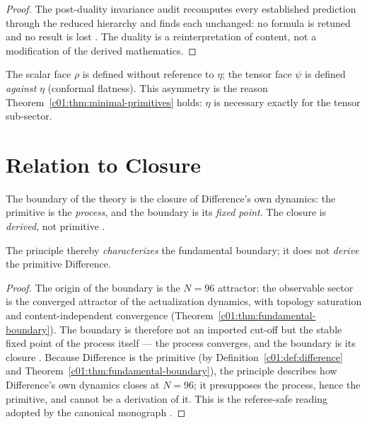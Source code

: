 \begin{proof}
The post-duality invariance audit recomputes every established prediction through the
reduced hierarchy and finds each unchanged: no formula is retuned and no result is lost
\cite{c01:QG301}. The duality is a reinterpretation of content, not a modification of
the derived mathematics.
\end{proof}

\begin{remark}
The scalar face $\rho$ is defined without reference to $\eta$; the tensor face $\psi$ is
defined \emph{against} $\eta$ (conformal flatness). This asymmetry is the reason
Theorem~\ref{c01:thm:minimal-primitives} holds: $\eta$ is necessary exactly for the tensor
sub-sector.
\end{remark}

\section{Relation to Closure}
\label{c01:sec:closure}

\begin{theorem}
\label{c01:thm:closure}
The boundary of the theory is the closure of Difference's own dynamics: the primitive is the
\emph{process}, and the boundary is its \emph{fixed point}. The closure is
\emph{derived}, not primitive \cite{c01:QG282}.

The principle thereby \emph{characterizes} the fundamental boundary; it does not \emph{derive}
the primitive Difference. \label{c01:cor:closure-characterizes}
\end{theorem}

\begin{proof}
The origin of the boundary is the $N=96$ attractor: the observable sector is the converged
attractor of the actualization dynamics, with topology saturation and content-independent
convergence (Theorem~\ref{c01:thm:fundamental-boundary}). The boundary is therefore not an
imported cut-off but the stable fixed point of the process itself --- the process converges,
and the boundary is its closure \cite{c01:QG282}. Because Difference is the primitive (by
Definition~\ref{c01:def:difference} and Theorem~\ref{c01:thm:fundamental-boundary}), the
principle describes how Difference's own dynamics closes at $N=96$; it presupposes the
process, hence the primitive, and cannot be a derivation of it. This is the referee-safe
reading adopted by the canonical monograph \cite{c01:MONO007}.
\end{proof}

